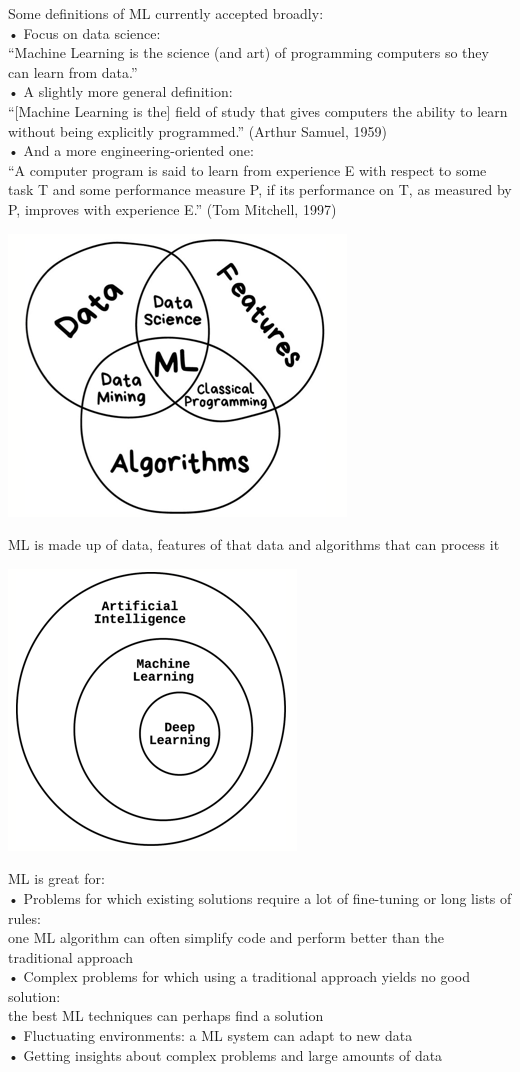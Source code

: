 \documentclass[]{project_plan}
\begin{document}
Some definitions of ML currently accepted broadly:\\
• Focus on data science: \\
“Machine Learning is the science (and art) of programming computers so they can learn from data.”\\
• A slightly more general definition:\\
“[Machine Learning is the] field of study that gives computers the ability
to learn without being explicitly programmed.” (Arthur Samuel, 1959)\\
• And a more engineering-oriented one:\\
“A computer program is said to learn from experience E with respect to
some task T and some performance measure P, if its performance on T, as
measured by P, improves with experience E.” (Tom Mitchell, 1997)

\includegraphics[width=.6\linewidth]{ML venn.png}

ML is made up of data, features of that data and algorithms that can process it

\includegraphics[width=.6\linewidth]{ai ml.png}

ML is great for:\\
• Problems for which existing solutions require a lot of fine-tuning or long lists of rules:\\
one ML algorithm can often simplify code and perform better than the traditional approach\\
• Complex problems for which using a traditional approach yields no good solution:\\
the best ML techniques can perhaps find a solution\\
• Fluctuating environments: a ML system can adapt to new data\\
• Getting insights about complex problems and large amounts of data
\end{document}
